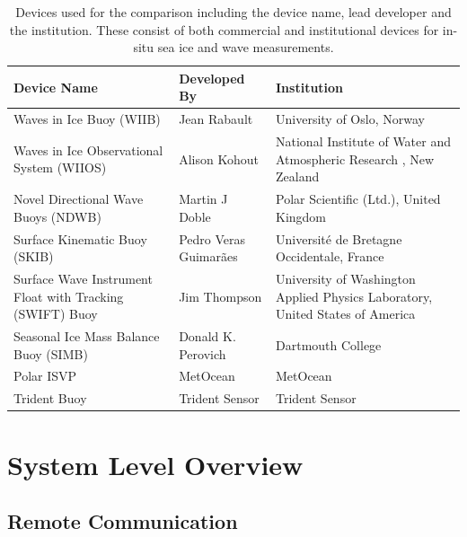 \begin{center}{\setlength{\extrarowheight}{5pt}%
		\begin{longtable}[H]{|>{\RaggedRight}m{}|>{\RaggedRight}m{}| >{\RaggedRight}m{}|}
			\caption{Devices used for the comparison including the device name, lead developer and the institution. These consist of both commercial and institutional devices for in-situ sea ice and wave measurements.}\\
			\hline
			\label{tab:device_list}
			\textbf{Device Name} & \textbf{Developed By} & \textbf{Institution}\\
			\hline
			Waves in Ice Buoy (WIIB) & Jean Rabault & University of Oslo, Norway \cite{rabault2019open} \\
			\hline
			Waves in Ice Observational System (WIIOS) & Alison Kohout & National Institute of Water and Atmospheric Research \cite{kohout2015device}, New Zealand \\
			\hline
			Novel Directional Wave Buoys (NDWB) & Martin J Doble &  Polar Scientific (Ltd.), United Kingdom \cite{doble2017robust}\\
			\hline
			Surface Kinematic Buoy (SKIB) & Pedro Veras Guimarães & Université de Bretagne Occidentale, France \cite{guimaraes2018surface} \\
			\hline
			Surface Wave Instrument Float with Tracking (SWIFT) Buoy & Jim Thompson & University of Washington Applied Physics Laboratory, United States of America \cite{thomson2012wave}\\
			\hline
			Seasonal Ice Mass Balance Buoy (SIMB) & Donald K. Perovich & Dartmouth College \cite{planck2019evolution} \\
			\hline
			Polar ISVP & MetOcean & MetOcean \\
			\hline
			Trident Buoy & Trident Sensor & Trident Sensor \\
			\hline
		\end{longtable}
	}
\end{center}


\section{System Level Overview}

\subsection{Remote Communication}
\label{ch2:sec_remote}

